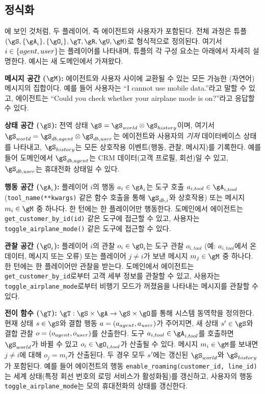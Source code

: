 \subsection{\decpomdp 정식화}
\label{sec:decpomdp_framework}

에 보인 것처럼,   두 플레이어, 즉 에이전트와 사용자가 포함된다. 전체 과정은 튜플 $(\gS, \{\gA_i\}, \{\gO_i\}, \gT, \gR, \gU, \gM)$로 형식적으로 정의된다. 여기서 $i \in \{agent, user\}$는 플레이어를 나타내며, 튜플의 각 구성 요소는 아래에서 자세히 설명한다. 예시는 새 \telecom 도메인에서 가져왔다.

\textbf{메시지 공간 ($\gM$):} 에이전트와 사용자 사이에 교환될 수 있는 모든 가능한 (자연어) 메시지의 집합이다. 예를 들어 사용자는 ``I cannot use mobile data.''라고 말할 수 있고, 에이전트는 ``Could you check whether your airplane mode is on?''라고 응답할 수 있다.

\textbf{상태 공간 ($\gS$):} 전역 상태 $\gS = \gS_{world} \otimes \gS_{history}$이며, 여기서 $\gS_{world} = \gS_{db,\agent} \otimes \gS_{db,\user}$는 에이전트와 사용자의 \textit{기저} 데이터베이스 상태를 나타내고, $\gS_{history}$는 모든 상호작용 이벤트(행동, 관찰, 메시지)를 기록한다. 예를 들어 \telecom 도메인에서 $\gS_{db,\agent}$는 CRM 데이터(고객 프로필, 회선)일 수 있고, $\gS_{db,\user}$는 휴대전화 상태일 수 있다.

\textbf{행동 공간 ($\gA_i$):} 플레이어 $i$의 행동 $a_i \in \gA_i$는 도구 호출 $a_{i,tool} \in \gA_{i,tool}$ (\texttt{tool\_name(**kwargs)} 같은 함수 호출을 통해 $\gS_{db,i}$와 상호작용) 또는 메시지 $m_i \in \gM$ 중 하나다. 한 턴에는 한 플레이어만 행동한다. \telecom 도메인에서 에이전트는 \texttt{get\_customer\_by\_id(id)} 같은 도구에 접근할 수 있고, 사용자는 \texttt{toggle\_airplane\_mode()} 같은 도구에 접근할 수 있다.

\textbf{관찰 공간 ($\gO_i$):} 플레이어 $i$의 관찰 $o_i \in \gO_i$는 도구 관찰 $o_{i,tool}$ (예: $a_{i,tool}$에서 온 데이터, 메시지 또는 오류) 또는 플레이어 $j \neq i$가 보낸 메시지 $m_j \in \gM$ 중 하나다. 한 턴에는 한 플레이어만 관찰을 받는다. \telecom 도메인에서 에이전트는 \texttt{get\_customer\_by\_id}로부터 고객 세부 정보를 관찰할 수 있고, 사용자는 \texttt{toggle\_airplane\_mode}로부터 비행기 모드가 꺼졌음을 나타내는 메시지를 관찰할 수 있다.

\textbf{전이 함수 ($\gT$):} $\gT: \gS \times \gA \to \gS \times \gO$를 통해 시스템 동역학을 정의한다. 현재 상태 $s \in \gS$와 결합 행동 $a=(a_{agent}, a_{user})$가 주어지면, 새 상태 $s' \in \gS$와 결합 관찰 $o = (o_{agent}, o_{user})$를 산출한다. 도구 $a_{i,tool} \in \gA_{i,tool}$를 호출하면 $\gS_{world}$가 바뀔 수 있고 $o_i \in \gO_{i,tool}$가 산출될 수 있다. 메시지 $m_i \in \gM$를 보내면 $j \neq i$에 대해 $o_j=m_i$가 산출된다. 두 경우 모두 $s'$에는 갱신된 $\gS_{world}$와 $\gS_{history}$가 포함된다. 예를 들어 에이전트의 행동 \texttt{enable\_roaming(customer\_id, line\_id)}는 세계 상태(특정 회선 번호의 로밍 서비스가 활성화됨)를 갱신하고, 사용자의 행동 \texttt{toggle\_airplane\_mode}는 모의 휴대전화의 상태를 갱신한다.

